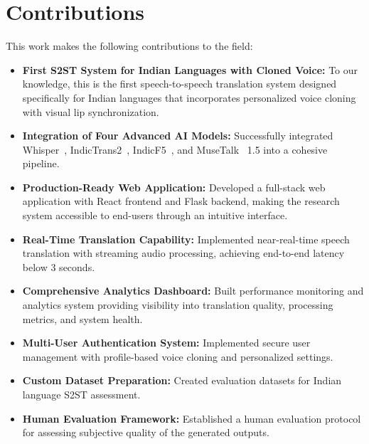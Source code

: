 \documentclass[12pt,oneside]{report}
\begin{document}
\section{Contributions}

This work makes the following contributions to the field:

\begin{itemize}
    \item \textbf{First S2ST System for Indian Languages with Cloned Voice:} To our knowledge, this is the first speech-to-speech translation system designed specifically for Indian languages that incorporates personalized voice cloning with visual lip synchronization.
    
    \item \textbf{Integration of Four Advanced AI Models:} Successfully integrated Whisper~\cite{radford2023whisper}, IndicTrans2~\cite{gala2023indictrans2}, IndicF5~\cite{indicf5_2025}, and MuseTalk~\cite{zhang2023musetalk} 1.5 into a cohesive pipeline.
    
    \item \textbf{Production-Ready Web Application:} Developed a full-stack web application with React frontend and Flask backend, making the research system accessible to end-users through an intuitive interface.
    
    \item \textbf{Real-Time Translation Capability:} Implemented near-real-time speech translation with streaming audio processing, achieving end-to-end latency below 3 seconds.
    
    \item \textbf{Comprehensive Analytics Dashboard:} Built performance monitoring and analytics system providing visibility into translation quality, processing metrics, and system health.
    
    \item \textbf{Multi-User Authentication System:} Implemented secure user management with profile-based voice cloning and personalized settings.
    
    \item \textbf{Custom Dataset Preparation:} Created evaluation datasets for Indian language S2ST assessment.
    
    \item \textbf{Human Evaluation Framework:} Established a human evaluation protocol for assessing subjective quality of the generated outputs.
\end{itemize}
\end{document}
